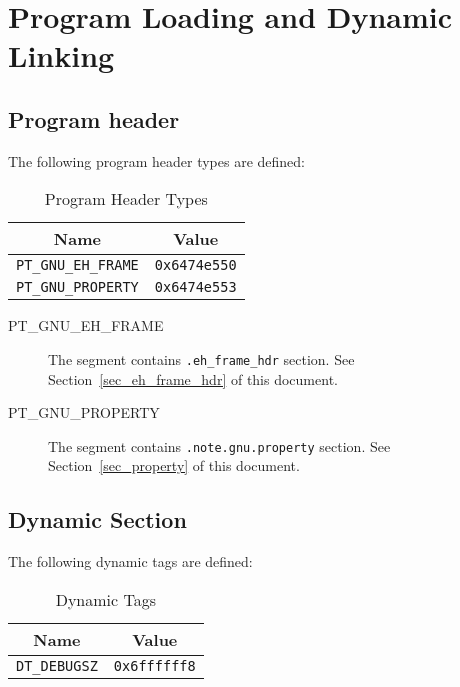 \chapter{Program Loading and Dynamic Linking}

\section{Program header}

The following \xOS program header types are defined:

\begin{table}[H]
\Hrule
  \caption{Program Header Types}
  \begin{center}
    \begin{tabular}[t]{l|l}
      \multicolumn{1}{c}{Name} & \multicolumn{1}{c}{Value} \\
      \hline
      \texttt{PT_GNU_EH_FRAME} & \texttt{0x6474e550} \\
      \texttt{PT_GNU_PROPERTY} & \texttt{0x6474e553} \\
    \end{tabular}
  \end{center}
\Hrule
\end{table}

\begin{description}
 \item[PT_GNU_EH_FRAME]
      The segment contains \texttt{.eh_frame_hdr} section.  See
      Section~\ref{sec_eh_frame_hdr} of this document.
 \item[PT_GNU_PROPERTY]
      The segment contains \texttt{.note.gnu.property} section.  See
      Section~\ref{sec_property} of this document.
\end{description}

\section{Dynamic Section}

The following dynamic tags are defined:

\begin{table}[H]
\Hrule
  \caption{Dynamic Tags}
  \begin{center}
    \begin{tabular}[t]{l|l}
      \multicolumn{1}{c}{Name} & \multicolumn{1}{c}{Value} \\
      \hline
      \texttt{DT_DEBUGSZ} & \texttt{0x6ffffff8} \\
    \end{tabular}
  \end{center}
\Hrule
\end{table}

